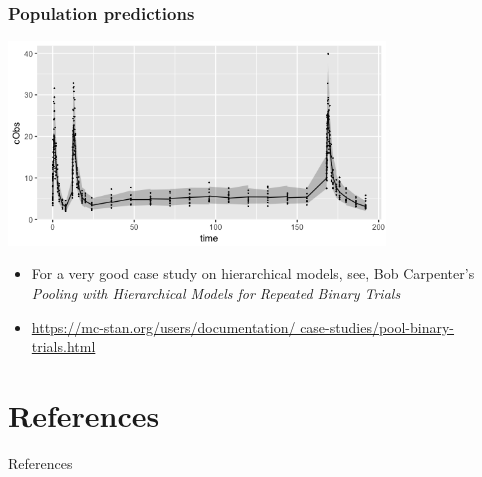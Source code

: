 \documentclass[xcolor=table]{beamer}
\begin{document}
\begin{frame}
  \frametitle{Population predictions}

  \begin{center}
    \includegraphics[width = 10cm]{../figures/PredictionPopulation.png}
  \end{center}

\end{frame}

\begin{frame}

  \begin{itemize}
    \item For a very good case study on hierarchical models, see,
    Bob Carpenter's \textit{Pooling with Hierarchical Models for Repeated Binary Trials}
   \item \url{https://mc-stan.org/users/documentation/ case-studies/pool-binary-trials.html}
 \end{itemize}

\end{frame}

\section{References}
\begin{frame}[allowframebreaks]{References}
\scriptsize
% 
%

  
\end{frame}
\end{document}

